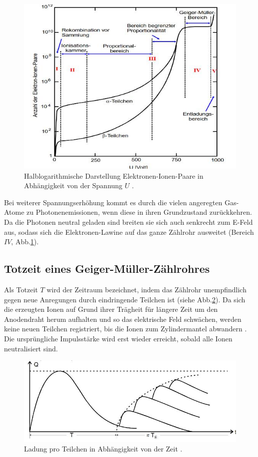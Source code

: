 \begin{figure}
\centering
\includegraphics[scale=0.5]{content/images/AU.jpg}
\caption{Halblogarithmische Darstellung Elektronen-Ionen-Paare in Abhängigkeit von der Spannung $U$ \cite{V703}.}
\label{fig:AU}
\end{figure}
Bei weiterer Spannungserhöhung kommt es durch die vielen angeregten Gas-Atome zu Photonenemissionen, wenn diese in ihren Grundzustand zurückkehren. Da die Photonen neutral geladen sind breiten sie sich auch senkrecht zum E-Feld aus, sodass sich die Elektronen-Lawine auf das ganze Zählrohr ausweitet (Bereich $IV$, Abb.\ref{fig:AU}).
\subsection{Totzeit eines Geiger-Müller-Zählrohres}
Als Totzeit $T$ wird der Zeitraum bezeichnet, indem das Zählrohr unempfindlich gegen neue Anregungen durch eindringende Teilchen ist (siehe Abb.\ref{fig:T}).
Da sich die erzeugten Ionen auf Grund ihrer Trägheit für längere Zeit um den Anodendraht herum aufhalten und so das elektrische Feld schwächen, werden keine neuen Teilchen registriert, bis die Ionen zum Zylindermantel abwandern \cite{V703}. Die ursprüngliche Impulsstärke wird erst wieder erreicht, sobald alle Ionen neutralisiert sind.\begin{figure}
\centering
\includegraphics[scale=0.5]{content/images/T.jpg}
\caption{Ladung pro Teilchen in Abhängigkeit von der Zeit \cite{V703}.}
\label{fig:T}
\end{figure}

